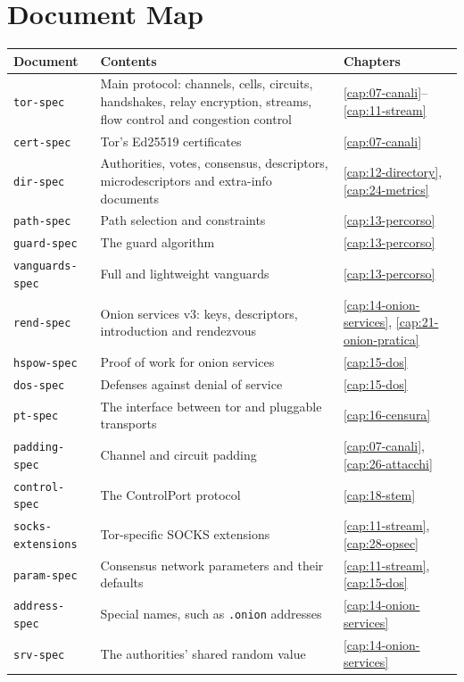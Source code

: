 \section{Document Map}\label{sec:C-mappa}

\begin{center}\small
\begin{tabularx}{\textwidth}{@{}l>{\raggedright\arraybackslash}Xl@{}}
\toprule
Document & Contents & Chapters \\
\midrule
\texttt{tor-spec} & Main protocol: channels, cells, circuits, handshakes, relay encryption, streams, flow control and congestion control & \ref{cap:07-canali}--\ref{cap:11-stream} \\
\texttt{cert-spec} & Tor's Ed25519 certificates & \ref{cap:07-canali} \\
\texttt{dir-spec} & Authorities, votes, consensus, descriptors, microdescriptors and extra-info documents & \ref{cap:12-directory}, \ref{cap:24-metrics} \\
\texttt{path-spec} & Path selection and constraints & \ref{cap:13-percorso} \\
\texttt{guard-spec} & The guard algorithm & \ref{cap:13-percorso} \\
\texttt{vanguards-spec} & Full and lightweight vanguards & \ref{cap:13-percorso} \\
\texttt{rend-spec} & Onion services v3: keys, descriptors, introduction and rendezvous & \ref{cap:14-onion-services}, \ref{cap:21-onion-pratica} \\
\texttt{hspow-spec} & Proof of work for onion services & \ref{cap:15-dos} \\
\texttt{dos-spec} & Defenses against denial of service & \ref{cap:15-dos} \\
\texttt{pt-spec} & The interface between tor and pluggable transports & \ref{cap:16-censura} \\
\texttt{padding-spec} & Channel and circuit padding & \ref{cap:07-canali}, \ref{cap:26-attacchi} \\
\texttt{control-spec} & The ControlPort protocol & \ref{cap:18-stem} \\
\texttt{socks-extensions} & Tor-specific SOCKS extensions & \ref{cap:11-stream}, \ref{cap:28-opsec} \\
\texttt{param-spec} & Consensus network parameters and their defaults & \ref{cap:11-stream}, \ref{cap:15-dos} \\
\texttt{address-spec} & Special names, such as \texttt{.onion} addresses & \ref{cap:14-onion-services} \\
\texttt{srv-spec} & The authorities' shared random value & \ref{cap:14-onion-services} \\
\bottomrule
\end{tabularx}
\end{center}

